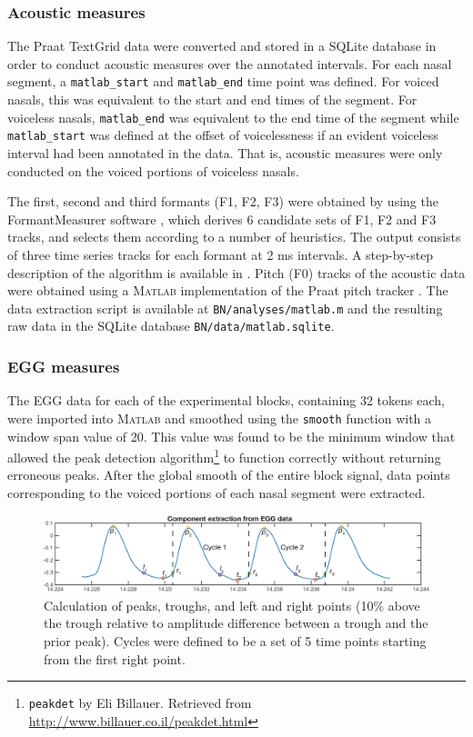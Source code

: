 \documentclass[12pt]{article}
\begin{document}
\subsubsection{Acoustic measures} %
\label{sub:acoustic_measures}

The Praat TextGrid data were converted and stored in a SQLite database in order to conduct acoustic measures over the annotated intervals. For each nasal segment, a \texttt{matlab\_start} and \texttt{matlab\_end} time point was defined. For voiced nasals, this was equivalent to the start and end times of the segment. For voiceless nasals, \texttt{matlab\_end} was equivalent to the end time of the segment while \texttt{matlab\_start} was defined at the offset of voicelessness if an evident voiceless interval had been annotated in the data. That is, acoustic measures were only conducted on the voiced portions of voiceless nasals.

The first, second and third formants (F1, F2, F3) were obtained by using the FormantMeasurer software \citep{morisson2011formant}, which derives 6 candidate sets of F1, F2 and F3 tracks, and selects them according to a number of heuristics. The output consists of three time series tracks for each formant at 2 ms intervals. A step-by-step description of the algorithm is available in \citet{zhang2013reliability}. Pitch (F0) tracks of the acoustic data were obtained using a \textsc{Matlab} implementation of the Praat pitch tracker \citet{boersma1993accurate}. The data extraction script is available at \texttt{BN/analyses/matlab.m} and the resulting raw data in the SQLite database \texttt{BN/data/matlab.sqlite}.

\subsubsection{EGG measures} %
\label{sub:egg_measures}

The EGG data for each of the experimental blocks, containing 32 tokens each, were imported into \textsc{Matlab} and smoothed using the \texttt{smooth} function with a window span value of 20. This value was found to be the minimum window that allowed the peak detection algorithm\footnote{\texttt{peakdet} by Eli Billauer. Retrieved from \url{http://www.billauer.co.il/peakdet.html}} to function correctly without returning erroneous peaks. After the global smooth of the entire block signal, data points corresponding to the voiced portions of each nasal segment were extracted.

\begin{figure}[h]
	\centering
	\includegraphics[width=6.5in]{figures/egg.eps}
	\caption{Calculation of peaks, troughs, and left and right points (10\% above the trough relative to amplitude difference between a trough and the prior peak). Cycles were defined to be a set of 5 time points starting from the first right point.}
	\label{fig:eggm}
\end{figure}
\end{document}
